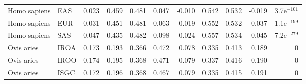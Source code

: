 \begin{center}
\begin{adjustbox}{width = 1\textwidth}
\begin{tabular}{llrrrrrrrrr}
        Homo sapiens &                       EAS &                              0.023 &                               0.459 &                 0.481 &                 0.047 &                             -0.010 &                               0.542 &                 0.532 &                -0.019 & 3.7e$^{-101}$ \\
        Homo sapiens &                       EUR &                              0.031 &                               0.451 &                 0.481 &                 0.063 &                             -0.019 &                               0.552 &                 0.532 &                -0.037 & 1.1e$^{-199}$ \\
        Homo sapiens &                       SAS &                              0.047 &                               0.435 &                 0.482 &                 0.098 &                             -0.024 &                               0.557 &                 0.534 &                -0.045 & 7.2e$^{-279}$ \\
          Ovis aries &                      IROA &                              0.173 &                               0.193 &                 0.366 &                 0.472 &                              0.078 &                               0.335 &                 0.413 &                 0.189 &             0 \\
          Ovis aries &                      IROO &                              0.174 &                               0.195 &                 0.368 &                 0.471 &                              0.079 &                               0.337 &                 0.416 &                 0.190 &             0 \\
          Ovis aries &                      ISGC &                              0.172 &                               0.196 &                 0.368 &                 0.467 &                              0.079 &                               0.335 &                 0.415 &                 0.191 &             0 \\
\bottomrule
\end{tabular}
\end{adjustbox}
\end{center}
